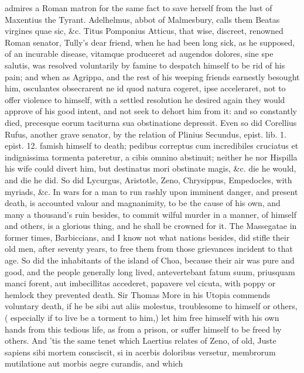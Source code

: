 admires a Roman matron for the same fact to save herself from the lust
of Maxentius the Tyrant. Adelhelmus, abbot of Malmesbury, calls them
Beatas virgines quae sic, \&c. Titus Pomponius Atticus, that wise,
discreet, renowned Roman senator, Tully's dear friend, when he had been
long sick, as he supposed, of an incurable disease, vitamque produceret
ad augendos dolores, sine spe salutis, was resolved voluntarily by
famine to despatch himself to be rid of his pain; and when as Agrippa,
and the rest of his weeping friends earnestly besought him, osculantes
obsecrarent ne id quod natura cogeret, ipse acceleraret, not to offer
violence to himself, with a settled resolution he desired again they
would approve of his good intent, and not seek to dehort him from it:
and so constantly died, precesque eorum taciturna sua obstinatione
depressit. Even so did Corellius Rufus, another grave senator, by the
relation of Plinius Secundus, epist. lib. 1. epist. 12. famish himself
to death; pedibus correptus cum incredibiles cruciatus et indignissima
tormenta pateretur, a cibis omnino abstinuit; neither he nor
Hispilla his wife could divert him, but destinatus mori obstinate
magis, \&c. die he would, and die he did. So did Lycurgus, Aristotle,
Zeno, Chrysippus, Empedocles, with myriads, \&c. In wars for a man to
run rashly upon imminent danger, and present death, is accounted valour
and magnanimity, to be the cause of his own, and many a
thousand's ruin besides, to commit wilful murder in a manner, of
himself and others, is a glorious thing, and he shall be crowned for
it. The  Massegatae in former times, Barbiccians, and I
know not what nations besides, did stifle their old men, after seventy
years, to free them from those grievances incident to that age. So did
the inhabitants of the island of Choa, because their air was pure and
good, and the people generally long lived, antevertebant fatum suum,
priusquam manci forent, aut imbecillitas accederet, papavere vel
cicuta, with poppy or hemlock they prevented death. Sir Thomas More in
his Utopia commends voluntary death, if he be sibi aut aliis molestus,
troublesome to himself or others, ( especially if to live be a
torment to him,) let him free himself with his own hands from this
tedious life, as from a prison, or suffer himself to be freed by
others. And 'tis the same tenet which Laertius relates of Zeno,
of old, Juste sapiens sibi mortem consciscit, si in acerbis doloribus
versetur, membrorum mutilatione aut morbis aegre curandis, and which
